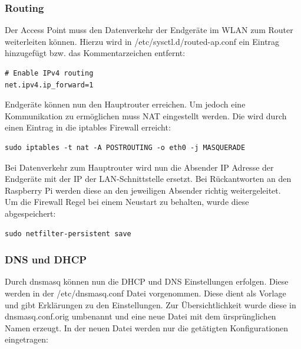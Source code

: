 \documentclass[a4paper,11pt,singlespacing]{article}
\begin{document}
            \subsubsection{Routing}
                Der Access Point muss den Datenverkehr der Endgeräte im WLAN zum Router weiterleiten können.
                Hierzu wird in /etc/sysctl.d/routed-ap.conf ein Eintrag hinzugefügt bzw. das Kommentarzeichen entfernt:\\
                \lstset{
                language=bash,
                }

                \begin{lstlisting}
# Enable IPv4 routing
net.ipv4.ip_forward=1
                \end{lstlisting} 
                Endgeräte können nun den Hauptrouter erreichen. Um jedoch eine Kommunikation zu ermöglichen muss NAT eingestellt werden. Die wird durch einen Eintrag in die iptables Firewall erreicht: \\
            
                \begin{lstlisting}
sudo iptables -t nat -A POSTROUTING -o eth0 -j MASQUERADE
                \end{lstlisting} 
       
                Bei Datenverkehr zum Hauptrouter wird nun die Absender IP Adresse der Endgeräte mit der IP der LAN-Schnittstelle ersetzt. Bei Rückantworten an den Raspberry Pi werden diese an den jeweiligen Absender richtig weitergeleitet.\\
            
                Um die Firewall Regel bei einem Neustart zu behalten, wurde diese abgespeichert:\\
                
                \begin{lstlisting}
sudo netfilter-persistent save
                \end{lstlisting}    
            \subsubsection{DNS und DHCP}
                Durch dnsmasq können nun die DHCP und DNS Einstellungen erfolgen. Diese werden in der /etc/dnsmasq.conf Datei vorgenommen. Diese dient als Vorlage und gibt Erklärungen zu den Einstellungen. Zur Übersichtlichkeit wurde diese in dnsmasq.conf.orig umbenannt und eine neue Datei mit dem ürsprünglichen Namen erzeugt. In der neuen Datei werden nur die getätigten Konfigurationen eingetragen:
            
\end{document}
